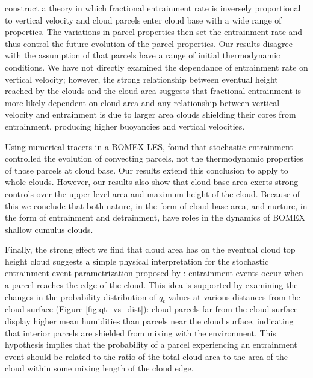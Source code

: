 \documentclass[acp]{copernicus}
\begin{document}
\cite{Neggers2002} construct a theory in which fractional entrainment rate 
is inversely proportional to vertical velocity and cloud parcels enter cloud 
base with a wide range of properties.  The variations in parcel properties then 
set the entrainment rate and thus control the future evolution of the parcel 
properties.  Our results disagree with the assumption of 
\citeauthor{Neggers2002} that parcels have a range of initial thermodynamic 
conditions.  We have not directly examined the dependance of entrainment rate 
on vertical velocity; however, the strong relationship between eventual height 
reached by the clouds and the cloud area suggests that fractional entrainment 
is more likely dependent on cloud area and any relationship between vertical 
velocity and entrainment is due to larger area clouds shielding their cores 
from entrainment, producing higher buoyancies and vertical velocities.

Using numerical tracers in a BOMEX LES, \cite{Romps2010a} found that 
stochastic entrainment controlled the evolution of convecting parcels, not 
the thermodynamic properties of those parcels at cloud base.  Our results 
extend this conclusion to apply to whole clouds.  However, our results also 
show that cloud base area exerts strong controls over the upper-level area and 
maximum height of the cloud.  Because of this we conclude that both nature, in 
the form of cloud base area, and nurture, in the form of entrainment and 
detrainment, have roles in the dynamics of BOMEX shallow cumulus clouds.  

Finally, the strong effect we find that cloud area has on the eventual cloud 
top height cloud suggests a simple physical interpretation for the stochastic 
entrainment event parametrization proposed by \cite{Romps2010a}: entrainment 
events occur when a parcel reaches the edge of the cloud.  This idea is 
supported by examining the changes in the probability distribution of $q_t$ 
values at various distances from the cloud surface (Figure 
\ref{fig:qt_vs_dist}): cloud parcels far from the cloud surface display higher
mean humidities than parcels near the cloud surface, indicating that interior 
parcels are shielded from mixing with the environment.  This hypothesis 
implies that the probability of a parcel experiencing an entrainment event 
should be related to the ratio of the total cloud area to the area of the 
cloud within some mixing length of the cloud edge.

\end{document}
